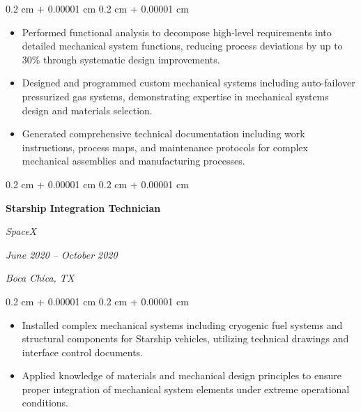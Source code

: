 \documentclass[10pt, letterpaper]{article}
\newenvironment{highlights}{
    \begin{itemize}[
        topsep=0.10 cm,
        parsep=0.10 cm,
        partopsep=0pt,
        itemsep=0pt,
        leftmargin=0.4 cm + 10pt
    ]
}{
    \end{itemize}
} %
\newenvironment{onecolentry}{
    \begin{adjustwidth}{
        0.2 cm + 0.00001 cm
    }{
        0.2 cm + 0.00001 cm
    }
}{
    \end{adjustwidth}
} %
\newenvironment{twocolentry}[2][]{
    \onecolentry
    \def\secondColumn{#2}
    \setcolumnwidth{\fill, 9.0 cm}
    \begin{paracol}{2}
}{
    \switchcolumn \raggedleft \secondColumn
    \end{paracol}
    \endonecolentry
} %
\begin{document}
        \vspace{0.10 cm}
        \begin{onecolentry}
            \begin{highlights}
                \item Performed functional analysis to decompose high-level requirements into detailed mechanical system functions, reducing process deviations by up to 30\% through systematic design improvements.
                \item Designed and programmed custom mechanical systems including auto-failover pressurized gas systems, demonstrating expertise in mechanical systems design and materials selection.
                \item Generated comprehensive technical documentation including work instructions, process maps, and maintenance protocols for complex mechanical assemblies and manufacturing processes.
            \end{highlights}
        \end{onecolentry}

        \vspace{0.35 cm}

        \begin{twocolentry}{
            \textit{June 2020 – October 2020}
            
            \textit{Boca Chica, TX}}
            \textbf{Starship Integration Technician}
            
            \textit{SpaceX}
        \end{twocolentry}

        \vspace{0.10 cm}
        \begin{onecolentry}
            \begin{highlights}
                \item Installed complex mechanical systems including cryogenic fuel systems and structural components for Starship vehicles, utilizing technical drawings and interface control documents.
                \item Applied knowledge of materials and mechanical design principles to ensure proper integration of mechanical system elements under extreme operational conditions.
            \end{highlights}
        \end{onecolentry}

        \vspace{0.35 cm}
\end{document}
